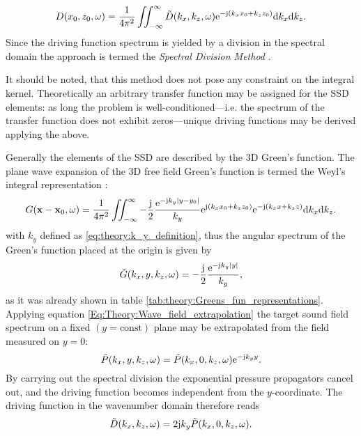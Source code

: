 \begin{equation}
D(x_0,z_0,\omega) = \frac{1}{4\pi^2} \iint_{-\infty}^{\infty} \tilde{D}(k_x,k_z, \omega) \mathrm{e}^{-\mathrm{j} (k_x x_0 + k_z z_0)} \mathrm{d} k_x \mathrm{d} k_z.
\label{Eq:Theory:Dkx_inverse_Fourier}
\end{equation}
Since the driving function spectrum is yielded by a division in the spectral domain the approach is termed the \emph{Spectral Division Method} \cite{Ahrens2010a, Ahrens2012:Ambisonics_for_planar_linear, Ahrens2011:icassp, Ahrens2010:Ambisonics_w_planar_linear}.

It should be noted, that this method does not pose any constraint on the integral kernel. Theoretically an arbitrary transfer function may be assigned for the SSD elements: as long the problem is well-conditioned---i.e. the spectrum of the transfer function does not exhibit zeros---unique driving functions may be derived applying the above.

\vspace{3mm}
Generally the elements of the SSD are described by the 3D Green's function. The plane wave expansion of the 3D free field Green's function is termed the Weyl's integral representation \cite{Williams1999, Lalor1969}:
\begin{equation}
G(\mathbf{x} - \mathbf{x}_0,\omega ) = \frac{1}{4\pi^2} \iint_{-\infty}^{\infty} -\frac{\mathrm{j}}{2}\frac{\mathrm{e}^{ -\mathrm{j} k_y  | y - y_0 |  }}{ k_y }
\mathrm{e}^{\mathrm{j} (k_x x_0 + k_z z_0)} \mathrm{e}^{-\mathrm{j} (k_x x + k_z z)} \mathrm{d} k_x \mathrm{d} k_z.
\label{Eq:Theory:Weyls_integral}
\end{equation}
with $k_y$ defined as \eqref{eq:theory:k_y_definition}, thus the angular spectrum of the Green's function placed at the origin is given by
\begin{equation}
\tilde{G}(k_x,y,k_z,\omega) =-\frac{\mathrm{j}}{2}\frac{\mathrm{e}^{ -\mathrm{j} k_y  | y |  }}{ k_y },
\end{equation}
as it was already shown in table \ref{tab:theory:Greens_fun_representations}.
Applying equation \eqref{Eq:Theory:Wave_field_extrapolation} the target sound field spectrum on a fixed $(y=\mathrm{const})$ plane may be extrapolated from the field measured on $y=0$:
\begin{equation}
\tilde{P}(k_x,y,k_z,\omega) = \tilde{P}(k_x,0,k_z,\omega) \mathrm{e}^{- \mathrm{j} k_y y}.
\label{Eq:Theory:Wave_field_extrapolation_2}
\end{equation}
By carrying out the spectral division the exponential pressure propagators cancel out, and the driving function becomes independent from the $y$-coordinate. The driving function in the wavenumber domain therefore reads
\begin{equation}
\tilde{D}(k_x,k_z,\omega) = 2\mathrm{j} k_y \tilde{P}(k_x,0,k_z,\omega).
\label{Eq:Theory:Planar_explicit_driv_fun}
\end{equation}

